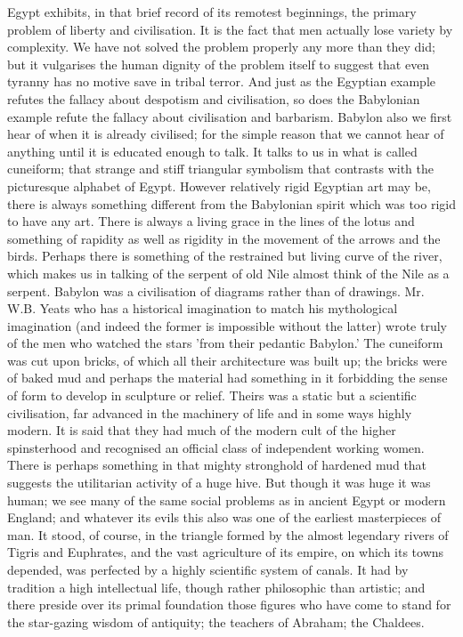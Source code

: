 Egypt exhibits, in that brief record of its remotest beginnings, the primary problem of liberty and civilisation. It is the fact that men actually lose variety by complexity. We have not solved the problem properly any more than they did; but it vulgarises the human dignity of the problem itself to suggest that even tyranny has no motive save in tribal terror. And just as the Egyptian example refutes the fallacy about despotism and civilisation, so does the Babylonian example refute the fallacy about civilisation and barbarism. Babylon also we first hear of when it is already civilised; for the simple reason that we cannot hear of anything until it is educated enough to talk. It talks to us in what is called cuneiform; that strange and stiff triangular symbolism that contrasts with the picturesque alphabet of Egypt. However relatively rigid Egyptian art may be, there is always something different from the Babylonian spirit which was too rigid to have any art. There is always a living grace in the lines of the lotus and something of rapidity as well as rigidity in the movement of the arrows and the birds. Perhaps there is something of the restrained but living curve of the river, which makes us in talking of the serpent of old Nile almost think of the Nile as a serpent. Babylon was a civilisation of diagrams rather than of drawings. Mr. W.B. Yeats who has a historical imagination to match his mythological imagination (and indeed the former is impossible without the latter) wrote truly of the men who watched the stars 'from their pedantic Babylon.' The cuneiform was cut upon bricks, of which all their architecture was built up; the bricks were of baked mud and perhaps the material had something in it forbidding the sense of form to develop in sculpture or relief. Theirs was a static but a scientific civilisation, far advanced in the machinery of life and in some ways highly modern. It is said that they had much of the modern cult of the higher spinsterhood and recognised an official class of independent working women. There is perhaps something in that mighty stronghold of hardened mud that suggests the utilitarian activity of a huge hive. But though it was huge it was human; we see many of the same social problems as in ancient Egypt or modern England; and whatever its evils this also was one of the earliest masterpieces of man. It stood, of course, in the triangle formed by the almost legendary rivers of Tigris and Euphrates, and the vast agriculture of its empire, on which its towns depended, was perfected by a highly scientific system of canals. It had by tradition a high intellectual life, though rather philosophic than artistic; and there preside over its primal foundation those figures who have come to stand for the star-gazing wisdom of antiquity; the teachers of Abraham; the Chaldees.

